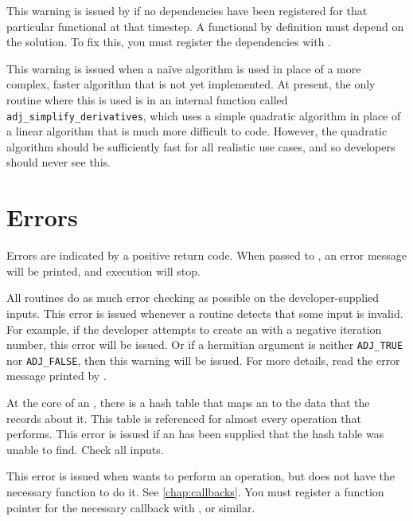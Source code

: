 This warning is issued by  if no dependencies have been
registered for that particular functional at that timestep. A functional by definition must depend on the solution. To fix this, you must register the dependencies with
.

This warning is issued when a na\"ive algorithm is used in place of a more complex,
faster algorithm that is not yet implemented. At present, the only routine where
this is used is in an internal function called \texttt{adj_simplify_derivatives}, which uses a simple quadratic
algorithm in place of a linear algorithm that is much more difficult to code.
However, the quadratic algorithm should be sufficiently fast for all realistic
use cases, and so developers should never see this.

\section{Errors}
Errors are indicated by a positive return code. When passed to ,
an error message will be printed, and execution will stop.

All \libadjoint routines do as much error checking as possible
on the developer-supplied inputs. This error is issued whenever a \libadjoint routine
detects that some input is invalid. For example, if the developer attempts to create
an  with a negative iteration number, this error will be issued. Or
if a hermitian argument is neither \texttt{ADJ_TRUE} nor \texttt{ADJ_FALSE}, then this warning
will be issued. For more details, read the error message printed by .

At the core of an , there is a hash table that maps an
 to the data that the  records about it.
This table is referenced for almost every operation that \libadjoint performs. This error
is issued if an  has been supplied that the hash table was
unable to find. Check all  inputs.

This error is issued when \libadjoint wants to perform an operation, but does
not have the necessary function to do it. See \autoref{chap:callbacks}. You
must register a function pointer for the necessary callback with ,
 or similar.

